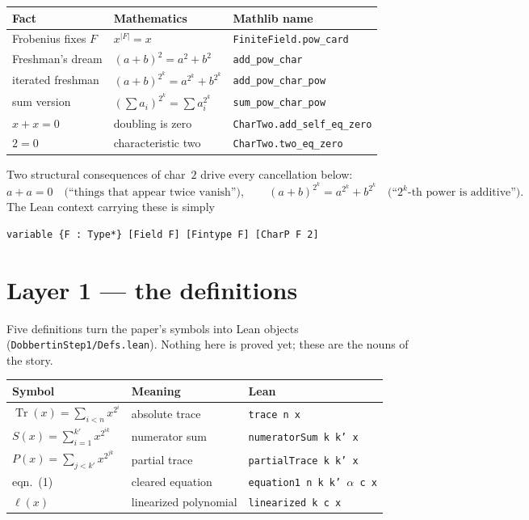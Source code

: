 \documentclass[11pt]{article}
\newcommand{\lc}[1]{\texttt{#1}}
\newcommand{\Tr}{\operatorname{Tr}}
\begin{document}
\begin{center}\small
\begin{tabular}{@{}lll@{}}
\toprule
\textbf{Fact} & \textbf{Mathematics} & \textbf{Mathlib name}\\
\midrule
Frobenius fixes $F$      & $x^{|F|}=x$                       & \lc{FiniteField.pow\_card}\\
Freshman's dream         & $(a+b)^2=a^2+b^2$                 & \lc{add\_pow\_char}\\
iterated freshman        & $(a+b)^{2^k}=a^{2^k}+b^{2^k}$     & \lc{add\_pow\_char\_pow}\\
sum version              & $(\sum a_i)^{2^k}=\sum a_i^{2^k}$ & \lc{sum\_pow\_char\_pow}\\
$x+x=0$                  & doubling is zero                  & \lc{CharTwo.add\_self\_eq\_zero}\\
$2=0$                    & characteristic two                & \lc{CharTwo.two\_eq\_zero}\\
\bottomrule
\end{tabular}
\end{center}

Two structural consequences of char~$2$ drive every cancellation below:
\[
  a+a=0 \quad\text{(``things that appear twice vanish'')},\qquad
  (a+b)^{2^k}=a^{2^k}+b^{2^k}\quad\text{(``$2^k$-th power is additive'')}.
\]
The Lean context carrying these is simply
\begin{lstlisting}
variable {F : Type*} [Field F] [Fintype F] [CharP F 2]
\end{lstlisting}

\section{Layer 1 --- the definitions}
Five definitions turn the paper's symbols into Lean objects
(\lc{DobbertinStep1/Defs.lean}).  Nothing here is proved yet; these are the
nouns of the story.

\begin{center}\small
\begin{tabular}{@{}lll@{}}
\toprule
\textbf{Symbol} & \textbf{Meaning} & \textbf{Lean}\\
\midrule
$\Tr(x)=\sum_{i<n}x^{2^i}$        & absolute trace        & \lc{trace n x}\\
$S(x)=\sum_{i=1}^{k'}x^{2^{ik}}$  & numerator sum         & \lc{numeratorSum k k' x}\\
$P(x)=\sum_{j<k'}x^{2^{jk}}$      & partial trace         & \lc{partialTrace k k' x}\\
eqn.~(1)                          & cleared equation      & \lc{equation1 n k k' $\alpha$ c x}\\
$\ell(x)$                         & linearized polynomial & \lc{linearized k c x}\\
\bottomrule
\end{tabular}
\end{center}
\end{document}
